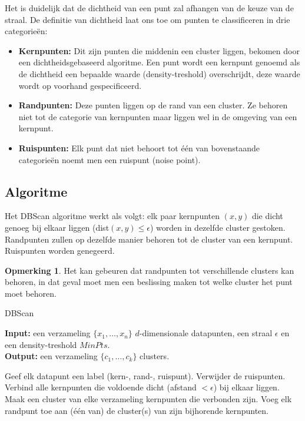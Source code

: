 \documentclass[a4paper,12pt]{article}
\theoremstyle{definition}
\newtheorem{opm}{Opmerking}[subsection]
\begin{document}
Het is duidelijk dat de dichtheid van een punt zal afhangen van de keuze van de
straal. De definitie van dichtheid laat ons toe om punten te classificeren in drie 
categorieën:
\begin{itemize}
	\item \textbf{Kernpunten:} Dit zijn punten die middenin een cluster liggen,
	bekomen door een dicht\-heidsgebaseerd algoritme.	Een punt wordt een kernpunt
	genoemd als de dichtheid een bepaalde waarde (density-treshold)
	overschrijdt, deze waarde wordt op voorhand gespecificeerd.
	
	\item \textbf{Randpunten:} Deze punten liggen op de rand van een cluster.
	Ze behoren niet tot de categorie van kernpunten maar liggen wel in de
	omgeving van een kernpunt.

	\item \textbf{Ruispunten:} Elk punt dat niet behoort tot één van
	bovenstaande categorieën noemt men een ruispunt (noise point).
\end{itemize}

\subsection{Algoritme}
Het DBScan algoritme werkt als volgt: elk paar kernpunten $(x,y)$ die dicht genoeg bij elkaar liggen (dist$(x,y)\leq \epsilon$) worden in dezelfde cluster
gestoken. Randpunten zullen op dezelfde manier behoren tot de cluster van een kernpunt. Ruispunten worden genegeerd.

\begin{opm}
Het kan gebeuren dat randpunten tot verschillende clusters kan behoren, in dat geval moet men een beslissing maken tot welke cluster het punt moet behoren.
\end{opm}

\begin{algorithm}
\caption{DBScan}\label{dbscan}
\textbf{Input:} een verzameling $\{x_1, \ldots, x_n\}$ $d$-dimensionale datapunten, een straal $\epsilon$ en een density-treshold $MinPts$.\\
\textbf{Output:} een verzameling $\{c_1, \ldots, c_k\}$ clusters.
\begin{algorithmic}[1]
\State Geef elk datapunt een label (kern-, rand-, ruispunt).
\State Verwijder de ruispunten.
\State Verbind alle kernpunten die voldoende dicht (afstand $<\epsilon$) bij elkaar liggen.
\State Maak een cluster van elke verzameling kernpunten die verbonden zijn.
\State Voeg elk randpunt toe aan (één van) de cluster(s) van zijn bijhorende kernpunten.
\end{algorithmic}
\end{algorithm}
\end{document}

